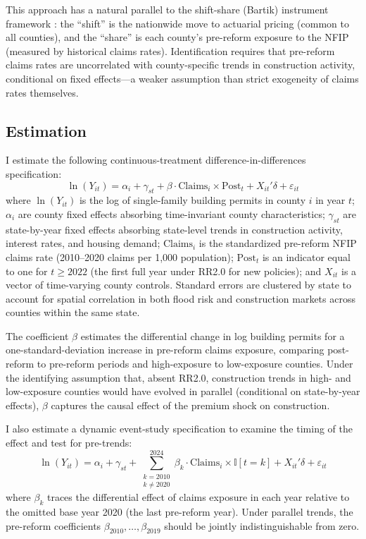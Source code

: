 \documentclass[12pt]{article}
\newcommand{\ind}{\mathbb{I}}
\begin{document}
This approach has a natural parallel to the shift-share (Bartik) instrument framework \citep{bartik1991}: the ``shift'' is the nationwide move to actuarial pricing (common to all counties), and the ``share'' is each county's pre-reform exposure to the NFIP (measured by historical claims rates). Identification requires that pre-reform claims rates are uncorrelated with county-specific trends in construction activity, conditional on fixed effects---a weaker assumption than strict exogeneity of claims rates themselves.

\subsection{Estimation}

I estimate the following continuous-treatment difference-in-differences specification:
\begin{equation}
\label{eq:main}
\ln(Y_{it}) = \alpha_i + \gamma_{st} + \beta \cdot \text{Claims}_i \times \text{Post}_t + X_{it}'\delta + \varepsilon_{it}
\end{equation}
where $\ln(Y_{it})$ is the log of single-family building permits in county $i$ in year $t$; $\alpha_i$ are county fixed effects absorbing time-invariant county characteristics; $\gamma_{st}$ are state-by-year fixed effects absorbing state-level trends in construction activity, interest rates, and housing demand; $\text{Claims}_i$ is the standardized pre-reform NFIP claims rate (2010--2020 claims per 1,000 population); $\text{Post}_t$ is an indicator equal to one for $t \geq 2022$ (the first full year under RR2.0 for new policies); and $X_{it}$ is a vector of time-varying county controls. Standard errors are clustered by state to account for spatial correlation in both flood risk and construction markets across counties within the same state.

The coefficient $\beta$ estimates the differential change in log building permits for a one-standard-deviation increase in pre-reform claims exposure, comparing post-reform to pre-reform periods and high-exposure to low-exposure counties. Under the identifying assumption that, absent RR2.0, construction trends in high- and low-exposure counties would have evolved in parallel (conditional on state-by-year effects), $\beta$ captures the causal effect of the premium shock on construction.

I also estimate a dynamic event-study specification to examine the timing of the effect and test for pre-trends:
\begin{equation}
\label{eq:event}
\ln(Y_{it}) = \alpha_i + \gamma_{st} + \sum_{\substack{k=2010 \\ k \neq 2020}}^{2024} \beta_k \cdot \text{Claims}_i \times \ind[t = k] + X_{it}'\delta + \varepsilon_{it}
\end{equation}
where $\beta_k$ traces the differential effect of claims exposure in each year relative to the omitted base year 2020 (the last pre-reform year). Under parallel trends, the pre-reform coefficients $\beta_{2010}, \ldots, \beta_{2019}$ should be jointly indistinguishable from zero.
\end{document}
